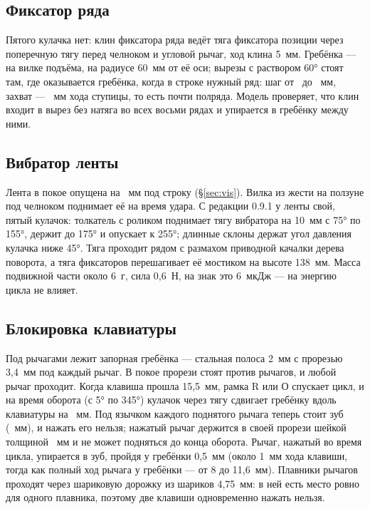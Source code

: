 \subsection{Фиксатор ряда}

Пятого кулачка нет: клин фиксатора ряда ведёт тяга фиксатора позиции через поперечную тягу перед челноком и угловой рычаг, ход клина 5~мм. Гребёнка — на вилке подъёма, на радиусе 60~мм от её оси; вырезы с раствором 60° стоят там, где оказывается гребёнка, когда в строке нужный ряд: шаг от \mrdpmin\ до \mrdpmax~мм, захват — \mrdhub~мм хода ступицы, то есть почти полряда. Модель проверяет, что клин входит в вырез без натяга во всех восьми рядах и упирается в гребёнку между ними.

\subsection{Вибратор ленты}

Лента в покое опущена на \mribdrop~мм под строку (\S\ref{sec:vis}). Вилка из жести на ползуне под челноком поднимает её на время удара. С редакции 0.9.1 у ленты свой, пятый кулачок: толкатель с роликом поднимает тягу вибратора на 10~мм с 75° по 155°, держит до 175° и опускает к 255°; длинные склоны держат угол давления кулачка ниже 45°. Тяга проходит рядом с размахом приводной качалки дерева поворота, а тяга фиксаторов перешагивает её мостиком на высоте 138~мм. Масса подвижной части около 6~г, сила 0,6~Н, на знак это 6~мкДж — на энергию цикла не влияет.

\subsection{Блокировка клавиатуры}

Под рычагами лежит запорная гребёнка — стальная полоса 2~мм с прорезью 3,4~мм под каждый рычаг. В покое прорези стоят против рычагов, и любой рычаг проходит. Когда клавиша прошла 15,5~мм, рамка R или О спускает цикл, и на время оборота (с 5° по 345°) кулачок через тягу сдвигает гребёнку вдоль клавиатуры на \mlockshift~мм. Под язычком каждого поднятого рычага теперь стоит зуб (\mlocktooth~мм), и нажать его нельзя; нажатый рычаг держится в своей прорези шейкой толщиной \mlockneck~мм и не может подняться до конца оборота. Рычаг, нажатый во время цикла, упирается в зуб, пройдя у гребёнки 0,5~мм (около 1~мм хода клавиши, тогда как полный ход рычага у гребёнки — от 8 до 11,6~мм). Плавники рычагов проходят через шариковую дорожку из шариков 4,75~мм: в ней есть место ровно для одного плавника, поэтому две клавиши одновременно нажать нельзя.

